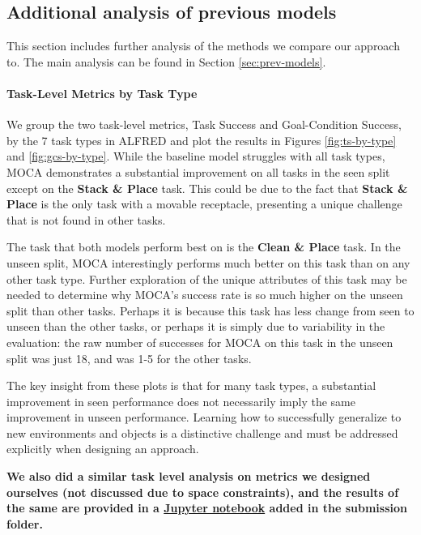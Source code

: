 \documentclass[11pt,a4paper]{article}
\begin{document}
\subsection {Additional analysis of previous models}
This section includes further analysis of the methods we compare our approach to. The main analysis can be found in Section \ref{sec:prev-models}.
\paragraph{Task-Level Metrics by Task Type}
We group the two task-level metrics, Task Success and Goal-Condition Success, by the 7 task types in ALFRED and plot the results in Figures \ref{fig:ts-by-type} and \ref{fig:gcs-by-type}. While the baseline model struggles with all task types, MOCA demonstrates a substantial improvement on all tasks in the seen split except on the \textbf{Stack \& Place} task. This could be due to the fact that \textbf{Stack \& Place} is the only task with a movable receptacle, presenting a unique challenge that is not found in other tasks. 

The task that both models perform best on is the \textbf{Clean \& Place} task. In the unseen split, MOCA interestingly performs much better on this task than on any other task type. Further exploration of the unique attributes of this task may be needed to determine why MOCA's success rate is so much higher on the unseen split than other tasks. Perhaps it is because this task has less change from seen to unseen than the other tasks, or perhaps it is simply due to variability in the evaluation: the raw number of successes for MOCA on this task in the unseen split was just 18, and was 1-5 for the other tasks.

The key insight from these plots is that for many task types, a substantial improvement in seen performance does not necessarily imply the same improvement in unseen performance. Learning how to successfully generalize to new environments and objects is a distinctive challenge and must be addressed explicitly when designing an approach.

\textbf{We also did a similar task level analysis on metrics we designed ourselves (not discussed due to space constraints), and the results of the same are provided in a \href{https://github.com/ankit61/group-tars-alfred/blob/main/Reports/4-Analysis-of-Baselines/results_analysis.ipynb}{Jupyter notebook} added in the submission folder.}
\end{document}
